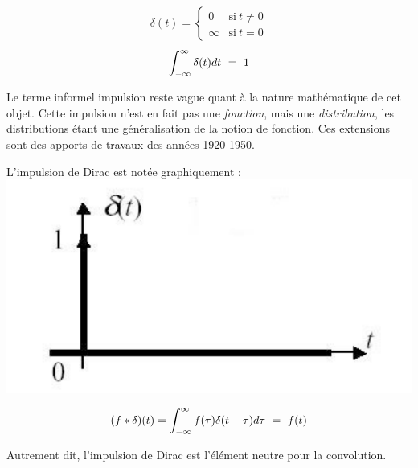 \begin{definition}
\begin{eqnarray}
    \delta(t)=
\begin{cases}
  0   & \text{si}~t\neq0 \\
  \infty & \text{si}~t=0 
\end{cases}
\end{eqnarray}
\begin{equation}
  \int_{-\infty}^{\infty} \delta(t)dt~=~1
\end{equation}
\end{definition}

Le terme informel { impulsion } reste vague quant à la nature mathématique de cet objet.
Cette impulsion n'est en fait pas une \emph{fonction}, mais une \emph{distribution},
 les distributions étant une généralisation de la notion de fonction. Ces extensions sont des apports de travaux des années 1920-1950. 

L'impulsion de Dirac est notée graphiquement :
\includegraphics[scale=0.38]{dirac2.pdf} 

\begin{proposition}

\begin{equation}
 (f*\delta)(t)=\int_{-\infty}^{\infty} f(\tau)\delta(t-\tau)d\tau~=~f(t)
\label{proprietedirac}
\end{equation}

Autrement dit, l'impulsion de Dirac est l'élément neutre pour la convolution.
\end{proposition}


%

